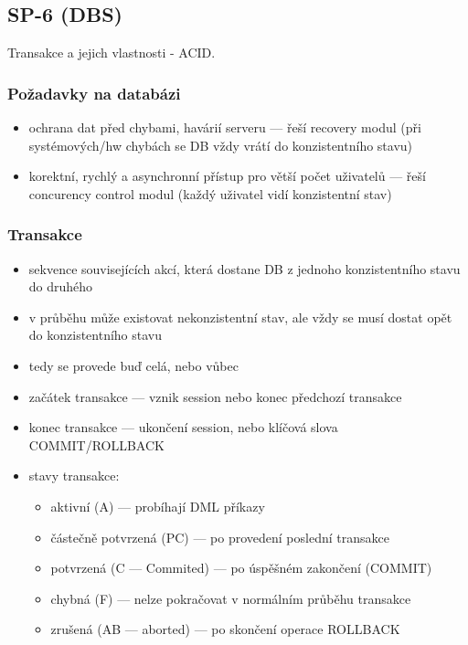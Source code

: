 \subsection{SP-6 (DBS)}
Transakce a jejich vlastnosti - ACID.

\subsubsection*{Požadavky na databázi}
\begin{itemize}
	\item ochrana dat před chybami, havárií serveru --- řeší recovery modul (při systémových/hw chybách se DB vždy vrátí do konzistentního stavu)
	\item korektní, rychlý a asynchronní přístup pro větší počet uživatelů --- řeší concurency control modul (každý uživatel vidí konzistentní stav)
\end{itemize}

\subsubsection*{Transakce}
\begin{itemize}
	\item sekvence souvisejících akcí, která dostane DB z jednoho konzistentního stavu do druhého
	\item v průběhu může existovat nekonzistentní stav, ale vždy se musí dostat opět do konzistentního stavu
	\item tedy se provede buď celá, nebo vůbec
	\item začátek transakce --- vznik session nebo konec předchozí transakce
	\item konec transakce --- ukončení session, nebo klíčová slova COMMIT/ROLLBACK
	\item stavy transakce:
	\begin{itemize}
		\item aktivní (A) --- probíhají DML příkazy
		\item částečně potvrzená (PC) --- po provedení poslední transakce
		\item potvrzená (C --- Commited) --- po úspěšném zakončení (COMMIT)
		\item chybná (F) --- nelze pokračovat v normálním průběhu transakce
		\item zrušená (AB --- aborted) --- po skončení operace ROLLBACK
	\end{itemize}
\end{itemize}

